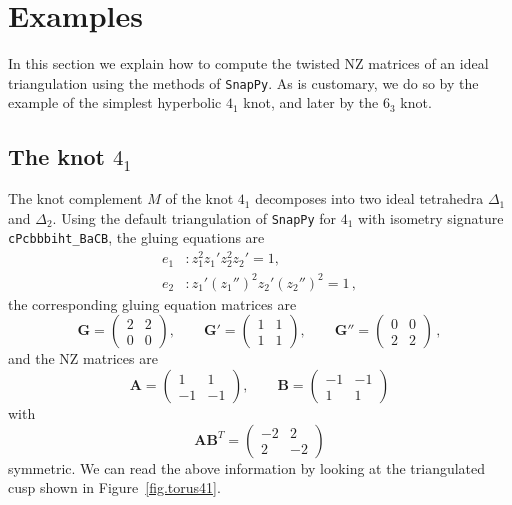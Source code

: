 \documentclass[12pt,reqno]{amsart}
\theoremstyle{definition}
\begin{document}
\section{Examples}
\label{sec.examples}

In this section we explain how to compute the twisted NZ matrices
of an ideal triangulation using the methods of \texttt{SnapPy}.
As is customary, we do so by the example of the simplest hyperbolic $4_1$
knot, and later by the $6_3$ knot. 

\subsection{The  knot $4_1$}
\label{sub.41a}


The knot complement $M$ of the knot $4_1$ decomposes into two ideal tetrahedra
$\Delta_1$ and $\Delta_2$. Using the default triangulation of \texttt{SnapPy}
for $4_1$ with isometry signature \texttt{cPcbbbiht\_BaCB}, 
the gluing equations are
\begin{align*}
	e_1&: z_1^2 z_1' z_2^2 z_2'=1, \\
	e_2&: z_1' (z_1'')^2 z_2' (z_2'')^2=1 \,, 
\end{align*}
the corresponding gluing equation matrices are
\[
\mathbf{G}
= \begin{pmatrix}
  2 & 2 \\
  0 & 0
\end{pmatrix},
\qquad
\mathbf{G}'
= \begin{pmatrix}
  1 & 1 \\
  1 & 1
\end{pmatrix}, \qquad
\mathbf{G}''
= \begin{pmatrix}
  0 & 0 \\
  2 & 2
\end{pmatrix} \,,
\]
and the NZ matrices are
\[
\mathbf{A}= \begin{pmatrix} 1  &  1\\ -1 & -1 \end{pmatrix}, \qquad
\mathbf{B}= \begin{pmatrix} -1  & - 1 \\ 1 & 1 \end{pmatrix} 
\]
with
\[
\mathbf{A} \mathbf{B}^T = \begin{pmatrix} -2 & 2 \\ 2 & -2 \end{pmatrix}   
\]
symmetric. We can read the above information by looking at the triangulated cusp
shown in Figure~\ref{fig.torus41}.
\end{document}
